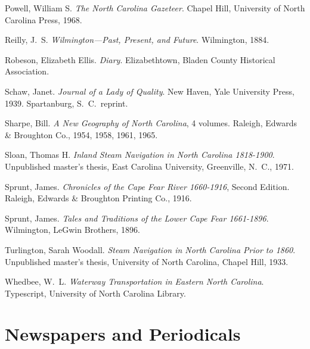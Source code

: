 \documentclass[11pt, a5paper, openright]{book}
\begin{document}
\begin{thebibliography}{99}
  Powell, William S.  \emph{The North Carolina Gazeteer}.  Chapel Hill,
  University of North Carolina Press, 1968.

  Reilly, J.~S.  \emph{Wilmington---Past, Present, and Future}.  Wilmington,
  1884.

  Robeson, Elizabeth Ellis.  \emph{Diary}.  Elizabethtown, Bladen County Historical Association.

  Schaw, Janet.  \emph{Journal of a Lady of Quality}.  New Haven, Yale
  University Press, 1939.  Spartanburg, S.~C.~reprint.

  Sharpe, Bill.  \emph{A New Geography of North Carolina}, 4 volumes.  Raleigh,
  Edwards \& Broughton Co., 1954, 1958, 1961, 1965.

  Sloan, Thomas H.  \emph{Inland Steam Navigation in North Carolina 1818-1900}. %
  Unpublished master's thesis, East Carolina University, Greenville, N.~C., 1971.

  Sprunt, James.  \emph{Chronicles of the Cape Fear River 1660-1916}, Second %
  Edition.  Raleigh, Edwards \& Broughton Printing Co., 1916.

  Sprunt, James.  \emph{Tales and Traditions of the Lower Cape Fear 1661-1896}. %
  Wilmington, LeGwin Brothers, 1896.

  Turlington, Sarah Woodall.  \emph{Steam Navigation in North Carolina Prior
    to 1860}.  Unpublished master's thesis, University of North Carolina, Chapel
  Hill, 1933.

  Whedbee, W.~L.  \emph{Waterway Transportation in Eastern North Carolina}.
  Typescript, University of North Carolina Library.


\section*{Newspapers and Periodicals}


\end{thebibliography}
\end{document}
